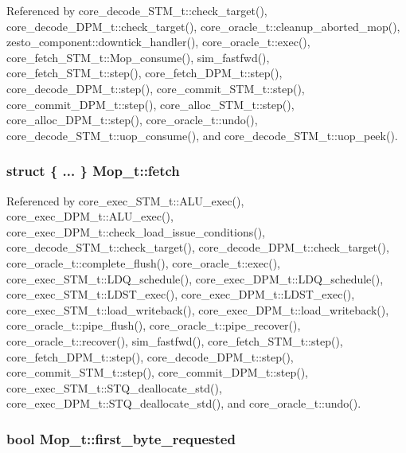Referenced by core\_\-decode\_\-STM\_\-t::check\_\-target(), core\_\-decode\_\-DPM\_\-t::check\_\-target(), core\_\-oracle\_\-t::cleanup\_\-aborted\_\-mop(), zesto\_\-component::downtick\_\-handler(), core\_\-oracle\_\-t::exec(), core\_\-fetch\_\-STM\_\-t::Mop\_\-consume(), sim\_\-fastfwd(), core\_\-fetch\_\-STM\_\-t::step(), core\_\-fetch\_\-DPM\_\-t::step(), core\_\-decode\_\-DPM\_\-t::step(), core\_\-commit\_\-STM\_\-t::step(), core\_\-commit\_\-DPM\_\-t::step(), core\_\-alloc\_\-STM\_\-t::step(), core\_\-alloc\_\-DPM\_\-t::step(), core\_\-oracle\_\-t::undo(), core\_\-decode\_\-STM\_\-t::uop\_\-consume(), and core\_\-decode\_\-STM\_\-t::uop\_\-peek().
\subsubsection[{fetch}]{\setlength{\rightskip}{0pt plus 5cm}struct \{ ... \}   {\bf Mop\_\-t::fetch}}\label{structMop__t_068ff277465b6ed03aad00e96daccc62}




Referenced by core\_\-exec\_\-STM\_\-t::ALU\_\-exec(), core\_\-exec\_\-DPM\_\-t::ALU\_\-exec(), core\_\-exec\_\-DPM\_\-t::check\_\-load\_\-issue\_\-conditions(), core\_\-decode\_\-STM\_\-t::check\_\-target(), core\_\-decode\_\-DPM\_\-t::check\_\-target(), core\_\-oracle\_\-t::complete\_\-flush(), core\_\-oracle\_\-t::exec(), core\_\-exec\_\-STM\_\-t::LDQ\_\-schedule(), core\_\-exec\_\-DPM\_\-t::LDQ\_\-schedule(), core\_\-exec\_\-STM\_\-t::LDST\_\-exec(), core\_\-exec\_\-DPM\_\-t::LDST\_\-exec(), core\_\-exec\_\-STM\_\-t::load\_\-writeback(), core\_\-exec\_\-DPM\_\-t::load\_\-writeback(), core\_\-oracle\_\-t::pipe\_\-flush(), core\_\-oracle\_\-t::pipe\_\-recover(), core\_\-oracle\_\-t::recover(), sim\_\-fastfwd(), core\_\-fetch\_\-STM\_\-t::step(), core\_\-fetch\_\-DPM\_\-t::step(), core\_\-decode\_\-DPM\_\-t::step(), core\_\-commit\_\-STM\_\-t::step(), core\_\-commit\_\-DPM\_\-t::step(), core\_\-exec\_\-STM\_\-t::STQ\_\-deallocate\_\-std(), core\_\-exec\_\-DPM\_\-t::STQ\_\-deallocate\_\-std(), and core\_\-oracle\_\-t::undo().
\subsubsection[{first\_\-byte\_\-requested}]{\setlength{\rightskip}{0pt plus 5cm}bool {\bf Mop\_\-t::first\_\-byte\_\-requested}}\label{structMop__t_6df8699de07dace3f1f67a9026536acb}




